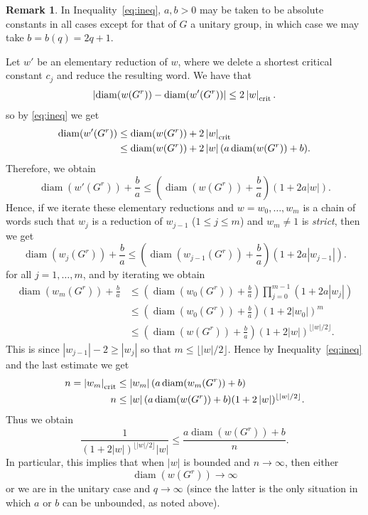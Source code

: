 \documentclass[a4paper,12pt]{amsproc}
\newcommand{\norm}[1]{\left\lvert#1\right\rvert}%
\DeclareMathOperator{\diam}{diam}%
\theoremstyle{plain}
\theoremstyle{definition}
\newtheorem{remark}[definition]{Remark}
\begin{document}
\begin{remark} \label{rmk:crit_length}
In Inequality~\eqref{eq:ineq}, $a,b>0$ may be taken to be absolute constants in all cases except for that of $G$ a unitary group, in which case we may take $b=b(q)=2q+1$.
\end{remark}

Let $w'$ be an elementary reduction of $w$, where we delete a shortest critical constant $c_j$ and reduce the resulting word. We have that
$$
\norm{\diam(w(G^r))-\diam(w'(G^r))}\leq 2\norm{w}_{\rm crit}.
$$
so by \eqref{eq:ineq} we get
\begin{align*}
\diam(w'(G^r))&\leq\diam(w(G^r))+2\norm{w}_{\rm crit}\\
&\leq\diam(w(G^r))+2\norm{w}(a\diam(w(G^r))+b).
\end{align*}
Therefore, we obtain
$$
\diam(w'(G^r))+\frac{b}{a}\leq\left(\diam(w(G^r))+\frac{b}{a}\right)\left(1+2a\norm{w}\right).
$$
Hence, if we iterate these elementary reductions and $w=w_0,\ldots,w_m$ is a chain of words such that $w_j$ is a reduction of $w_{j-1}$ ($1\leq j\leq m$) and $w_m\neq1$ is \emph{strict}, then we get
$$
\diam(w_j(G^r))+\frac{b}{a}\leq\left(\diam(w_{j-1}(G^r))+\frac{b}{a}\right)\left(1+2a\norm{w_{j-1}}\right).
$$
for all $j=1,\ldots,m$, and by iterating we obtain
\begin{align*}
\diam(w_m(G^r))+\frac{b}{a} &\leq \left(\diam(w_0(G^r))+\frac{b}{a}\right)\prod_{j=0}^{m-1}(1+2a\norm{w_j})\\
&\leq\left(\diam(w_0(G^r))+\frac{b}{a}\right)(1+2\norm{w_0})^m\\
&\leq\left(\diam(w(G^r))+\frac{b}{a}\right)(1+2\norm{w})^{\lfloor\norm{w}/2\rfloor}.
\end{align*}
This is since $\norm{w_{j-1}}-2\geq\norm{w_j}$ so that $m\leq\lfloor\norm{w}/2\rfloor$. Hence by Inequality~\eqref{eq:ineq} and the last estimate we get
\begin{align*}
n=\norm{w_m}_{\rm crit}&\leq\norm{w_m}(a\diam(w_m(G^r))+b)\\
n&\leq\norm{w}(a\diam(w(G^r))+b)(1+2\norm{w})^{\lfloor\norm{w}/2\rfloor}.
\end{align*}
Thus we obtain
\begin{equation}\label{eq:final_est}
\frac{1}{(1+2\norm{w})^{\lfloor\norm{w}/2\rfloor}\norm{w}}\leq\frac{a\diam(w(G^r))+b}{n}.   
\end{equation}
In particular, this implies that when $\norm{w}$ is bounded and $n\to\infty$, then either 
$$
\diam(w(G^r))\to\infty
$$ 
or we are in the unitary case and $q \to\infty$ (since the latter is the only situation in which $a$ or $b$ can be unbounded, as noted above). 
\end{document}
